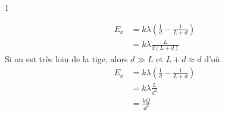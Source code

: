 \documentclass{tufte-handout}
\def\reponse{1}
\begin{document}
\if\reponse1
  {\color{tblue}
    \begin{align*}
      E_{x} &= k \lambda \left( \frac{1}{d} - \frac{1}{L + d} \right)  \\
            &= k \lambda  \frac{L}{d(L + d)}
    \end{align*}
    Si on est très loin de la tige, alors $d \gg L$ et $L + d \approx d$ d'où
    \begin{align*}
      E_{x} &= k \lambda \left( \frac{1}{d} - \frac{1}{L + d} \right)  \\
            &= k \lambda  \frac{L}{d^2}  \\
            &= \frac{kQ}{d^2}
    \end{align*}

  }
\else
  \vspace{1cm}
\fi










\end{document}
